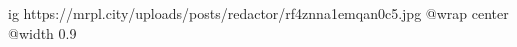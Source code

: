  
 
 
 
 

\ifcmt
  ig https://mrpl.city/uploads/posts/redactor/rf4znna1emqan0c5.jpg
  @wrap center
  @width 0.9
\fi
